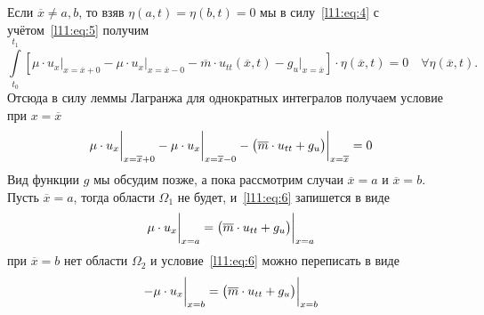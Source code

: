 \documentclass[12pt,a4paper,openany,fleqn]{book}
\theoremstyle{definition}
\begin{document}
Если $\overline{x}\neq a,b$, то взяв $\eta(a,t)=\eta(b,t)=0$ мы в силу~\eqref{l11:eq:4} с учётом~\eqref{l11:eq:5} получим
\begin{equation*}
	\int\limits_{t_0}^{t_1}\left[\mu\cdot u_x\bigg|_{x=\overline{x}+0}-\mu\cdot u_x\bigg|_{x=\overline{x}-0}-\overline{m}\cdot u_{tt}(\overline{x},t)-g_u\bigg|_{x=\overline{x}}\right]\cdot\eta(\overline{x},t)=0\quad\forall \eta(\overline{x},t).
\end{equation*}
Отсюда в силу леммы Лагранжа для однократных интегралов получаем условие при $x=\overline{x}$
\begin{equation}
	\label{l11:eq:6}
	\hfill \mu\cdot u_x\bigg|_{x=\overline{x}+0}-\mu\cdot u_x\bigg|_{x=\overline{x}-0}-\big(\overline{m}\cdot u_{tt}+g_u\big)\bigg|_{x=\overline{x}}=0\hfill
\end{equation}
Вид функции $g$ мы обсудим позже, а пока рассмотрим случаи $\overline{x}=a$ и $\overline{x}=b$. Пусть $\overline{x}=a$, тогда области $\Omega_1$ не будет, и~\eqref{l11:eq:6} запишется в виде 
\begin{equation}
	\label{l11:eq:7}
	\hfill\mu\cdot u_x\bigg|_{x=a}=\big(\overline{m}\cdot u_{tt}+g_u\big)\bigg|_{x=a}\hfill
\end{equation}
при $\overline{x}=b$ нет области $\Omega_2$ и условие~\eqref{l11:eq:6} можно переписать в виде 
\begin{equation}
	\label{l11:eq:8}
	\hfill-\mu\cdot u_x\bigg|_{x=b}=\big(\overline{m}\cdot u_{tt}+g_u\big)\bigg|_{x=b}\hfill
\end{equation} 
\end{document}
